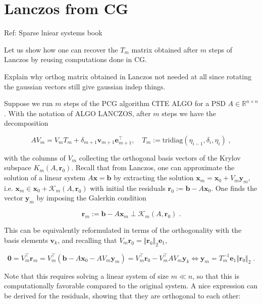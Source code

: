 \documentclass{article}
\newcommand{\vect}[1]{\boldsymbol{\mathbf{#1}}}
\newcommand{\R}{\mathbb R}
\newcommand{\norm}[1]{\Vert #1 \Vert}
\begin{document}
\section{Lanczos from CG}

Ref: Sparse lniear systems book


Let us show how one can recover the $T_m$ matrix obtained after $m$ steps of Lanczos by reusing computations done in CG. 

Explain why orthog matrix obtained in Lanczos not needed at all since rotating the gaussian vectors still give gaussian indep things.

Suppose we run $m$ steps of the PCG algorithm CITE ALGO for a PSD $A \in \R^{n\times n}$. With the notation of ALGO LANCZOS, after $m$ steps we have the decomposition

\begin{equation} \label{eq:arnoldi_decomp_lanczos}
    A V_m = V_m T_m + \delta_{m+1} \vect v_{m+1} \vect e_{m+1}^\top, \quad T_m := \text{tridiag}(\eta_{i-1}, \delta_i, \eta_i) \; ,
\end{equation}

with the columns of $V_m$ collecting the orthogonal basis vectors of the Krylov subspace $K_m(A, \vect r_0)$. Recall that from Lanczos, one can approximate the solution of a linear system $A\vect x = \vect b$ by extracting the solution $\vect x_m = \vect x_0 + V_m \vect y_m$, i.e. $\vect x_m \in \vect x_0 + \mathcal K_m(A, \vect r_0)$ with initial the residuals $\vect r_0 := \vect b - A \vect x_0$. One finds the vector $\vect y_m$ by imposing the Galerkin condition 

\begin{equation}
    \vect r_m := \vect b - A \vect x_m \perp \mathcal K_m(A, \vect r_0) \; .
\end{equation}

This can be equivalently reformulated in terms of the orthogonality with the basis elements $\vect v_k$, and recalling that $V_m \vect r_0 = \Vert \vect r_0 \Vert_2 \vect e_1$,

\begin{equation} \label{eq:lanczos_solution}
    \vect 0 = V_m^\top \vect r_m = V_m^\top (\vect b - A \vect x_0 - A V_m \vect y_m) = V_m^\top \vect r_0 - V_m^\top A V_m \vect y_k 
    \iff \vect y_m = T_m^{-1} \vect e_1 \norm{\vect r_0}_2 \; .
\end{equation}

Note that this requires solving a linear system of size $m \ll n$, so that this is computationally favorable compared to the original system. A nice expression can be derived for the residuals, showing that they are orthogonal to each other:
\end{document}
